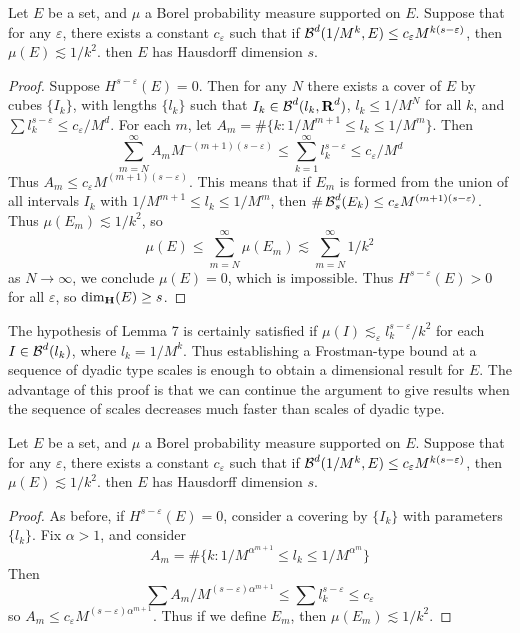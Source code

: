 \begin{lemma}
	Let $E$ be a set, and $\mu$ a Borel probability measure supported on $E$. Suppose that for any $\varepsilon$, there exists a constant $c_\varepsilon$ such that if $\operatorname{\mathcal{B}}^d(1/M^k,E) \leq c_\varepsilon M^{k(s-\varepsilon)}$, then $\mu(E) \lesssim 1/k^2$. then $E$ has Hausdorff dimension $s$.
\end{lemma}
\begin{proof}
	Suppose $H^{s-\varepsilon}(E) = 0$. Then for any $N$ there exists a cover of $E$ by cubes $\{ I_k \}$, with lengths $\{ l_k \}$ such that $I_k \in \operatorname{\mathcal{B}}^d(l_k,\operatorname{\mathbf{R}}^d)$, $l_k \leq 1/M^N$ for all $k$, and $\sum l_k^{s - \varepsilon} \leq c_\varepsilon/M^d$. For each $m$, let $A_m = \# \{ k : 1/M^{m+1} \leq l_k \leq 1/M^m \}$. Then
	\[ \sum_{m = N}^\infty A_m M^{-(m+1)(s - \varepsilon)} \leq \sum_{k = 1}^\infty l_k^{s - \varepsilon} \leq c_\varepsilon/M^d \]
	Thus $A_m \leq c_\varepsilon M^{(m+1)(s - \varepsilon)}$. This means that if $E_m$ is formed from the union of all intervals $I_k$ with $1/M^{m+1} \leq l_k \leq 1/M^m$, then $\# \operatorname{\mathcal{B}}^d_s(E_k) \leq c_\varepsilon M^{(m+1)(s-\varepsilon)}$. Thus $\mu(E_m) \lesssim 1/k^2$, so
	\[ \mu(E) \leq \sum_{m = N}^\infty \mu(E_m) \lesssim \sum_{m = N}^\infty 1/k^2 \]
	as $N \to \infty$, we conclude $\mu(E) = 0$, which is impossible. Thus $H^{s-\varepsilon}(E) > 0$ for all $\varepsilon$, so $\operatorname{\dim_{\mathbf{H}}}(E) \geq s$.
\end{proof}

The hypothesis of Lemma 7 is certainly satisfied if $\mu(I) \lesssim_\varepsilon l_k^{s - \varepsilon}/k^2$ for each $I \in \operatorname{\mathcal{B}}^d(l_k)$, where $l_k = 1/M^k$. Thus establishing a Frostman-type bound at a sequence of dyadic type scales is enough to obtain a dimensional result for $E$. The advantage of this proof is that we can continue the argument to give results when the sequence of scales decreases much faster than scales of dyadic type.

\begin{theorem}
	Let $E$ be a set, and $\mu$ a Borel probability measure supported on $E$. Suppose that for any $\varepsilon$, there exists a constant $c_\varepsilon$ such that if $\operatorname{\mathcal{B}}^d(1/M^k,E) \leq c_\varepsilon M^{k(s-\varepsilon)}$, then $\mu(E) \lesssim 1/k^2$. then $E$ has Hausdorff dimension $s$.
\end{theorem}
\begin{proof}
	As before, if $H^{s-\varepsilon}(E) = 0$, consider a covering by $\{ I_k \}$ with parameters $\{ l_k \}$. Fix $\alpha > 1$, and consider
	\[ A_m = \# \{ k : 1/M^{\alpha^{m + 1}} \leq l_k \leq 1/M^{\alpha^m} \} \]
	Then
	\[ \sum A_m/M^{(s - \varepsilon) \alpha^{m+1}} \leq \sum l_k^{s - \varepsilon} \leq c_\varepsilon \]
	so $A_m \leq c_\varepsilon M^{(s - \varepsilon) \alpha^{m+1}}$. Thus if we define $E_m$, then $\mu(E_m) \lesssim 1/k^2$.
\end{proof}

